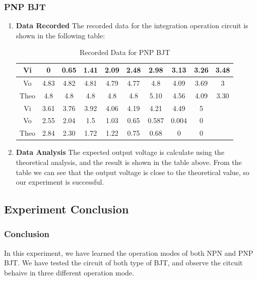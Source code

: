    \subsubsection{PNP BJT}
    \begin{enumerate}[I]
        \item \textbf{Data Recorded}\newline
            The recorded data for the integration operation circuit is shown in the following table:
            \begin{table}[H]
                \centering
                \begin{tabular}{|c|c|c|c|c|c|c|c|c|c|}
                    \hline
                    Vi   & 0    & 0.65 & 1.41 & 2.09 & 2.48 & 2.98  & 3.13  & 3.26 & 3.48 \\ \hline
                    Vo   & 4.83 & 4.82 & 4.81 & 4.79 & 4.77 & 4.8  & 4.09  & 3.69 & 3    \\ \hline
                    Theo & 4.8  & 4.8  & 4.8  & 4.8  & 4.8  & 5.10  & 4.56  & 4.09 & 3.30 \\ \hline
                    Vi   & 3.61 & 3.76 & 3.92 & 4.06 & 4.19 & 4.21  & 4.49  & 5    &      \\ \hline
                    Vo   & 2.55 & 2.04 & 1.5  & 1.03 & 0.65 & 0.587 & 0.004 & 0    &      \\ \hline
                    Theo & 2.84 & 2.30 & 1.72 & 1.22 & 0.75 & 0.68  & 0     & 0    &      \\ \hline
                \end{tabular}
                \caption{Recorded Data for PNP BJT}
                \label{tab:}
            \end{table}
        \item \textbf{Data Analysis}\newline
            The expected output voltage is calculate using the theoretical analysis, and the result is shown in the table above. From the table we can see that the output voltage is close to the theoretical value, so our experiment is successful.
    \end{enumerate}
    
\subsection{Experiment Conclusion}
    \subsubsection{Conclusion}
    In this experiment, we have learned the operation modes of both NPN and PNP BJT. We have tested the circuit of both type of BJT, and observe the citcuit behaive in three different operation mode.